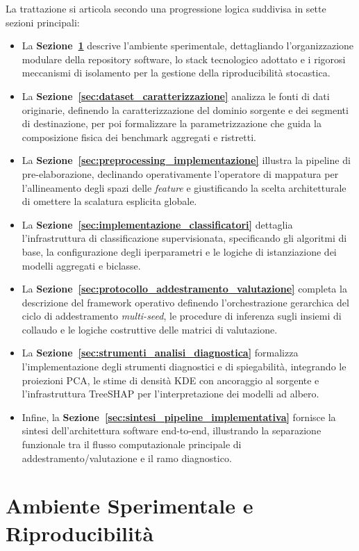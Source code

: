 La trattazione si articola secondo una progressione logica suddivisa in sette sezioni principali:
\begin{itemize}
    \item La \textbf{Sezione~\ref{sec:ambiente_sperimentale}} descrive l'ambiente sperimentale, dettagliando l'organizzazione modulare della repository software, lo stack tecnologico adottato e i rigorosi meccanismi di isolamento per la gestione della riproducibilità stocastica.
    \item La \textbf{Sezione~\ref{sec:dataset_caratterizzazione}} analizza le fonti di dati originarie, definendo la caratterizzazione del dominio sorgente e dei segmenti di destinazione, per poi formalizzare la parametrizzazione che guida la composizione fisica dei benchmark aggregati e ristretti.
    \item La \textbf{Sezione~\ref{sec:preprocessing_implementazione}} illustra la pipeline di pre-elaborazione, declinando operativamente l'operatore di mappatura per l'allineamento degli spazi delle \textit{feature} e giustificando la scelta architetturale di omettere la scalatura esplicita globale.
    \item La \textbf{Sezione~\ref{sec:implementazione_classificatori}} dettaglia l'infrastruttura di classificazione supervisionata, specificando gli algoritmi di base, la configurazione degli iperparametri e le logiche di istanziazione dei modelli aggregati e biclasse.
    \item La \textbf{Sezione~\ref{sec:protocollo_addestramento_valutazione}} completa la descrizione del framework operativo definendo l'orchestrazione gerarchica del ciclo di addestramento \textit{multi-seed}, le procedure di inferenza sugli insiemi di collaudo e le logiche costruttive delle matrici di valutazione.
    \item La \textbf{Sezione~\ref{sec:strumenti_analisi_diagnostica}} formalizza l'implementazione degli strumenti diagnostici e di spiegabilità, integrando le proiezioni PCA, le stime di densità KDE con ancoraggio al sorgente e l'infrastruttura TreeSHAP per l'interpretazione dei modelli ad albero.
    \item Infine, la \textbf{Sezione~\ref{sec:sintesi_pipeline_implementativa}} fornisce la sintesi dell'architettura software end-to-end, illustrando la separazione funzionale tra il flusso computazionale principale di addestramento/valutazione e il ramo diagnostico.
\end{itemize}

\section{Ambiente Sperimentale e Riproducibilità}
\label{sec:ambiente_sperimentale}

